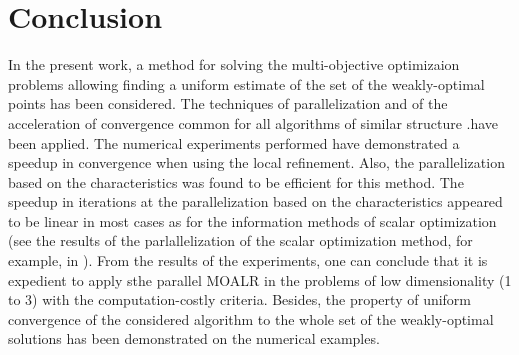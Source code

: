 \documentclass{llncs}
\begin{document}
\section{Conclusion}
In the present work, a method for solving the multi-objective optimizaion problems allowing
finding a uniform estimate of the set of the weakly-optimal points has been considered. The
techniques of parallelization and of the acceleration of convergence common for all algorithms
of similar structure .have been applied. The numerical experiments performed have
demonstrated a speedup in convergence when using the local refinement. Also, the
parallelization based on the characteristics was found to be efficient for this method. The
speedup in iterations at the parallelization based on the characteristics appeared to be linear in
most cases as for the information methods of scalar optimization (see the results of the
parlallelization of the scalar optimization method, for example, in
\cite{barkalovLebedef2016}). From the results of the experiments, one can conclude that it is
expedient to apply sthe parallel MOALR in the problems of low dimensionality (1 to 3) with
the computation-costly criteria. Besides, the property of uniform convergence of the considered
algorithm to the whole set of the weakly-optimal solutions has been demonstrated on the
numerical  examples.
%
%
%
%

%


\clearpage
{} %
\renewcommand{\indexname}{Author Index}
\printindex
\clearpage
\end{document}
